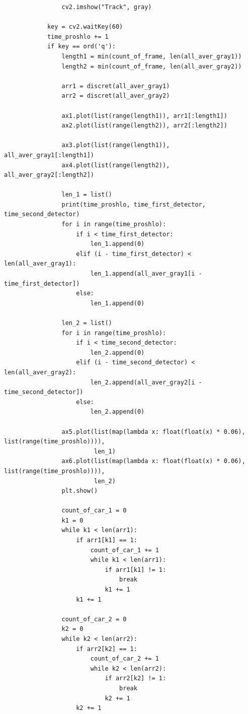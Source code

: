 \documentclass[a4paper,12pt]{article}
\begin{document}
\begin{verbatim}
                cv2.imshow("Track", gray)

            key = cv2.waitKey(60)
            time_proshlo += 1
            if key == ord('q'):
                length1 = min(count_of_frame, len(all_aver_gray1))
                length2 = min(count_of_frame, len(all_aver_gray2))

                arr1 = discret(all_aver_gray1)
                arr2 = discret(all_aver_gray2)

                ax1.plot(list(range(length1)), arr1[:length1])
                ax2.plot(list(range(length2)), arr2[:length2])

                ax3.plot(list(range(length1)), all_aver_gray1[:length1])
                ax4.plot(list(range(length2)), all_aver_gray2[:length2])

                len_1 = list()
                print(time_proshlo, time_first_detector, time_second_detector)
                for i in range(time_proshlo):
                    if i < time_first_detector:
                        len_1.append(0)
                    elif (i - time_first_detector) < len(all_aver_gray1):
                        len_1.append(all_aver_gray1[i - time_first_detector])
                    else:
                        len_1.append(0)

                len_2 = list()
                for i in range(time_proshlo):
                    if i < time_second_detector:
                        len_2.append(0)
                    elif (i - time_second_detector) < len(all_aver_gray2):
                        len_2.append(all_aver_gray2[i - time_second_detector])
                    else:
                        len_2.append(0)

                ax5.plot(list(map(lambda x: float(float(x) * 0.06), list(range(time_proshlo)))),
                         len_1)
                ax6.plot(list(map(lambda x: float(float(x) * 0.06), list(range(time_proshlo)))),
                         len_2)
                plt.show()

                count_of_car_1 = 0
                k1 = 0
                while k1 < len(arr1):
                    if arr1[k1] == 1:
                        count_of_car_1 += 1
                        while k1 < len(arr1):
                            if arr1[k1] != 1:
                                break
                            k1 += 1
                    k1 += 1

                count_of_car_2 = 0
                k2 = 0
                while k2 < len(arr2):
                    if arr2[k2] == 1:
                        count_of_car_2 += 1
                        while k2 < len(arr2):
                            if arr2[k2] != 1:
                                break
                            k2 += 1
                    k2 += 1


\end{verbatim}
\end{document}
